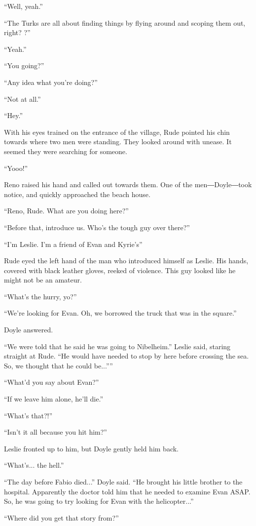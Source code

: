 \documentclass[oneside]{book}
\begin{document}
“Well, yeah.”

“The Turks are all about finding things by flying around and scoping them out, right? ?”

“Yeah.”

“You going?”

“Any idea what you’re doing?”

“Not at all.”

“Hey.”

With his eyes trained on the entrance of the village, Rude pointed his chin towards where two men were standing. They looked around with unease. It seemed they were searching for someone.

“Yooo!”

Reno raised his hand and called out towards them. One of the men―Doyle―took notice, and quickly approached the beach house.

“Reno, Rude. What are you doing here?”

“Before that, introduce us. Who’s the tough guy over there?”

“I’m Leslie. I’m a friend of Evan and Kyrie’s”

Rude eyed the left hand of the man who introduced himself as Leslie. His hands, covered with black leather gloves, reeked of violence. This guy looked like he might not be an amateur.

“What’s the hurry, yo?”

“We’re looking for Evan. Oh, we borrowed the truck that was in the square.”

Doyle answered.

“We were told that he said he was going to Nibelheim.” Leslie said, staring straight at Rude. “He would have needed to stop by here before crossing the sea. So, we thought that he could be...””

“What’d you say about Evan?”

“If we leave him alone, he’ll die.”

“What’s that?!”

“Isn’t it all because you hit him?”

Leslie fronted up to him, but Doyle gently held him back.

“What’s... the hell.”

“The day before Fabio died...” Doyle said. “He brought his little brother to the hospital. Apparently the doctor told him that he needed to examine Evan ASAP. So, he was going to try looking for Evan with the helicopter...”

“Where did you get that story from?”
\end{document}
